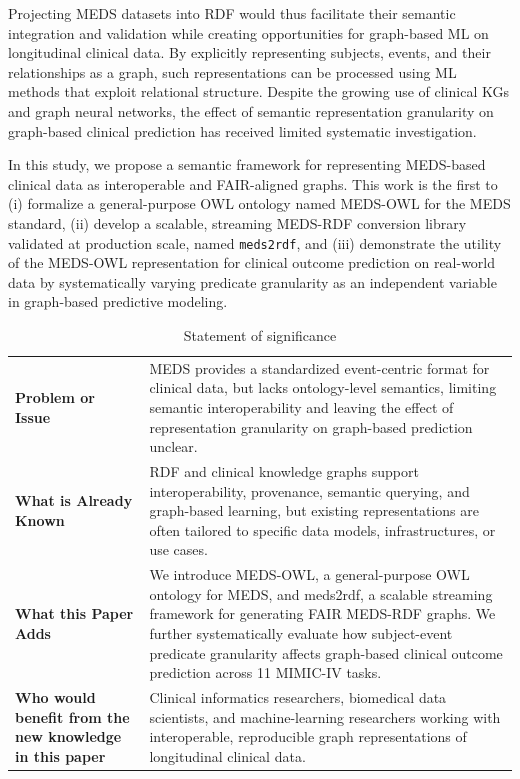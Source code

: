Projecting MEDS datasets into RDF would thus facilitate their semantic integration and validation while creating opportunities for graph-based ML on longitudinal clinical data. By explicitly representing subjects, events, and their relationships as a graph, such representations can be processed using ML methods that exploit relational structure\cite{schlichtkrull_2018}. Despite the growing use of clinical KGs and graph neural networks, the effect of semantic representation granularity on graph-based clinical prediction has received limited systematic investigation.

In this study, we propose a semantic framework for representing MEDS-based clinical data as interoperable and FAIR-aligned graphs. This work is the first to (i) formalize a general-purpose OWL ontology named MEDS-OWL for the MEDS standard, (ii) develop a scalable, streaming MEDS-RDF conversion library validated at production scale, named \texttt{meds2rdf}, and (iii) demonstrate the utility of the MEDS-OWL representation for clinical outcome prediction on real-world data by systematically varying predicate granularity as an independent variable in graph-based predictive modeling.

\begin{table}[htbp]
\centering

\setlength{\tabcolsep}{2pt}
\begin{tabular}{p{} p{}}
\toprule
\textbf{Problem or Issue} &
MEDS provides a standardized event-centric format for clinical data, but lacks ontology-level semantics, limiting semantic interoperability and leaving the effect of representation granularity on graph-based prediction unclear.
\\[0.5em]

\textbf{What is Already Known} &
RDF and clinical knowledge graphs support interoperability, provenance, semantic querying, and graph-based learning, but existing representations are often tailored to specific data models, infrastructures, or use cases.
\\[0.5em]

\textbf{What this Paper Adds} &
We introduce MEDS-OWL, a general-purpose OWL ontology for MEDS, and meds2rdf, a scalable streaming framework for generating FAIR MEDS-RDF graphs. We further systematically evaluate how subject-event predicate granularity affects graph-based clinical outcome prediction across 11 MIMIC-IV tasks.
\\[0.5em]

\textbf{Who would benefit from the new knowledge in this paper} &
Clinical informatics researchers, biomedical data scientists, and machine-learning researchers working with interoperable, reproducible graph representations of longitudinal clinical data.
\\
\bottomrule
\end{tabular}
\caption{Statement of significance}
\label{tab:paper3_statement-of-significance}
\end{table}

